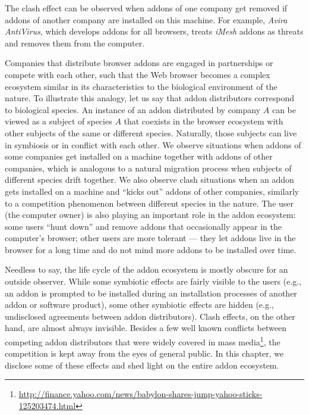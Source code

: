 \documentclass[11pt,oneside]{book}
\begin{document}
The clash effect can be observed when addons of one company get removed if addons of another company are installed on this machine. For example, \emph{Avira AntiVirus}, which develops addons for all browsers, treats \emph{iMesh} addons as threats and removes them from the computer.

Companies that distribute browser addons are engaged in partnerships or compete with each other, such that the Web browser becomes a complex ecosystem similar in its characteristics to the biological environment of the nature. To illustrate this analogy, let us say that addon distributors correspond to biological species. An instance of an addon distributed by company $A$ can be viewed as a subject of species $A$ that coexists in the browser ecosystem with other subjects of the same or different species. Naturally, those subjects can live in symbiosis or in conflict with each other. We observe situations when addons of some companies get installed on a machine together with addons of other companies, which is analogous to a natural migration process when subjects of different species drift together. We also observe clash situations when an addon gets installed on a machine and ``kicks out'' addons of other companies, similarly to a competition phenomenon between different species in the nature. The user (the computer owner) is also playing an important role in the addon ecosystem: some users ``hunt down'' and remove addons that occasionally appear in the computer's browser; other users are more tolerant --- they let addons live in the browser for a long time and do not mind more addons to be installed over time.

Needless to say, the life cycle of the addon ecosystem is mostly obscure for an outside observer. While some symbiotic effects are fairly visible to the users (e.g., an addon is prompted to be installed during an installation processes of another addon or software product), some other symbiotic effects are hidden (e.g., undisclosed agreements between addon distributors). Clash effects, on the other hand, are almost always invisible. Besides a few well known conflicts between competing addon distributors that were widely covered in mass media\footnote{\url{http://finance.yahoo.com/news/babylon-shares-jump-yahoo-sticks-125203474.html}}, the competition is kept away from the eyes of general public. In this chapter, we disclose some of these effects and shed light on the entire addon ecosystem. 
\end{document}

